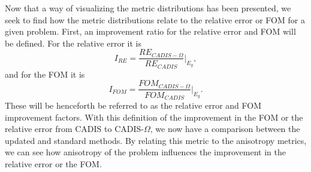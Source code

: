 Now that a way of visualizing the metric distributions has been presented,
we seek to find
how the metric distributions relate to the relative error or FOM for a given
problem. First, an improvement ratio for the relative error and FOM will be
defined. For the relative error it is
\begin{equation}
  I_{RE} = \frac{RE_{CADIS-\Omega}}{RE_{CADIS}}\bigg\rvert_{E_g},
  \label{eq:I-RE}
\end{equation}
and for the FOM it is
\begin{equation}
  I_{FOM} = \frac{FOM_{CADIS-\Omega}}{FOM_{CADIS}}\bigg\rvert_{E_g}.
  \label{eq:I-FOM}
\end{equation}
These will be henceforth be referred to as the relative error and FOM
improvement factors.
With this definition of the improvement in the FOM or the relative
error from CADIS to CADIS-$\Omega$, we now have a comparison between the updated
and standard methods. By relating this metric to the anisotropy metrics, we can
see how anisotropy of the problem influences the improvement in the relative
error or the FOM.

